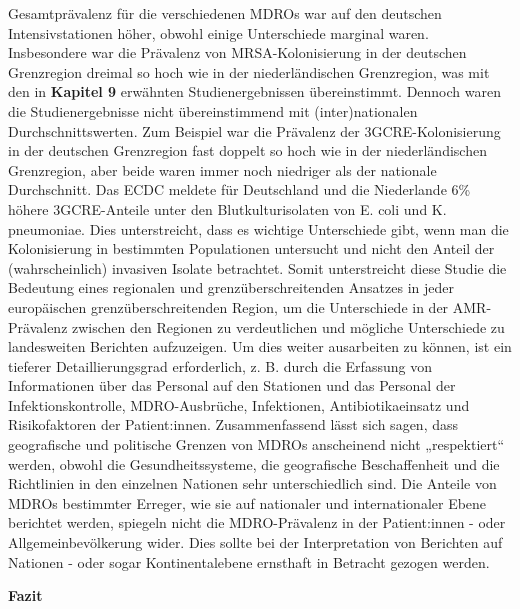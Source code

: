 \documentclass[
]{book}
\begin{document}
Gesamtprävalenz für die verschiedenen MDROs war auf den deutschen Intensivstationen höher, obwohl einige Unterschiede marginal waren. Insbesondere war die Prävalenz von MRSA-Kolonisierung in der deutschen Grenzregion dreimal so hoch wie in der niederländischen Grenzregion, was mit den in \textbf{Kapitel 9} erwähnten Studienergebnissen übereinstimmt. Dennoch waren die Studienergebnisse nicht übereinstimmend mit (inter)nationalen Durchschnittswerten. Zum Beispiel war die Prävalenz der 3GCRE-Kolonisierung in der deutschen Grenzregion fast doppelt so hoch wie in der niederländischen Grenzregion, aber beide waren immer noch niedriger als der nationale Durchschnitt. Das ECDC meldete für Deutschland und die Niederlande 6\% höhere 3GCRE-Anteile unter den Blutkulturisolaten von E. coli und K. pneumoniae. Dies unterstreicht, dass es wichtige Unterschiede gibt, wenn man die Kolonisierung in bestimmten Populationen untersucht und nicht den Anteil der (wahrscheinlich) invasiven Isolate betrachtet. Somit unterstreicht diese Studie die Bedeutung eines regionalen und grenzüberschreitenden Ansatzes in jeder europäischen grenzüberschreitenden Region, um die Unterschiede in der AMR-Prävalenz zwischen den Regionen zu verdeutlichen und mögliche Unterschiede zu landesweiten Berichten aufzuzeigen. Um dies weiter ausarbeiten zu können, ist ein tieferer Detaillierungsgrad erforderlich, z. B. durch die Erfassung von Informationen über das Personal auf den Stationen und das Personal der Infektionskontrolle, MDRO-Ausbrüche, Infektionen, Antibiotikaeinsatz und Risikofaktoren der Patient:innen. Zusammenfassend lässt sich sagen, dass geografische und politische Grenzen von MDROs anscheinend nicht „respektiert`` werden, obwohl die Gesundheitssysteme, die geografische Beschaffenheit und die Richtlinien in den einzelnen Nationen sehr unterschiedlich sind. Die Anteile von MDROs bestimmter Erreger, wie sie auf nationaler und internationaler Ebene berichtet werden, spiegeln nicht die MDRO-Prävalenz in der Patient:innen - oder Allgemeinbevölkerung wider. Dies sollte bei der Interpretation von Berichten auf Nationen - oder sogar Kontinentalebene ernsthaft in Betracht gezogen werden.

\textbf{Fazit}
\end{document}
